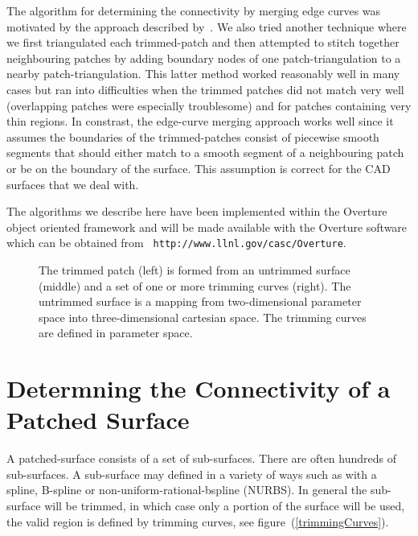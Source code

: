 \documentclass[11pt]{article}
\begin{document}
 The algorithm for determining the connectivity by merging edge curves
was motivated by the approach described by~\cite{gridGen}. We also
tried another technique where we first triangulated each trimmed-patch
and then attempted to stitch together neighbouring patches by adding
boundary nodes of one patch-triangulation to a nearby
patch-triangulation. This latter method worked reasonably well in many
cases but ran into difficulties when the trimmed patches did not match
very well (overlapping patches were especially troublesome) and for
patches containing very thin regions. In constrast, the edge-curve
merging approach works well since it assumes the boundaries of the
trimmed-patches consist of piecewise smooth segments that should
either match to a smooth segment of a neighbouring patch or be on the
boundary of the surface. This assumption is correct for the CAD
surfaces that we deal with.

The algorithms we describe here have been implemented within the
Overture object oriented framework\cite{??} and will be made available
with the Overture software which can be obtained from {\tt
http://\-www.llnl.gov/\-casc/\-Overture}.



\begin{figure}[hbt]
  \begin{center}
  \end{center}
\caption{The trimmed patch (left) is formed from an untrimmed surface (middle) and a set of one or
more trimming curves (right). The untrimmed surface is a mapping from two-dimensional parameter space
into three-dimensional cartesian space. The trimming curves are defined in parameter space.} \label{trimmedPatched}
\end{figure}


\section{Determning the Connectivity of a Patched Surface}


A patched-surface consists of a set of sub-surfaces. There are often
hundreds of sub-surfaces.  A sub-surface may defined in a variety of
ways such as with a spline, B-spline or non-uniform-rational-bspline
(NURBS).  In general the sub-surface will be trimmed, in which case
only a portion of the surface will be used, the valid region is
defined by trimming curves, see figure~(\ref{trimmingCurves}).
\end{document}
